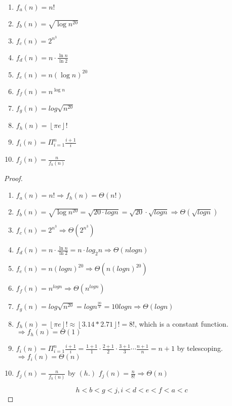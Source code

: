 \documentclass[11pt]{article}
\newcommand{\floor}[1]{\left\lfloor #1 \right\rfloor}
\begin{document}
\begin{enumerate}
\begin{enumerate}
\item \(f_a(n) = n!\)
\item \(f_b(n) = \sqrt{\log{n^{20}}}\)
\item \(f_c(n) = 2^{n^{3}}\)
\item \(f_d(n) = n \cdot \frac{\ln n}{\ln 2}\)
\item \(f_e(n) = n(\log{n})^{20}\)
\item \(f_f(n) = n^{\log{n}}\)
\item \(f_g(n) = log{\sqrt{n^{20}}}\)
\item \(f_h(n) = \floor{\pi e}!\)
\item \(f_i(n) = \Pi^{n}_{i=1} \frac{i+1}{i}\)
\item \(f_j(n) = \frac{n}{f_h(n)}\)
\end{enumerate}

\begin{proof}
\

\begin{enumerate}
    \item \(f_a(n) = n! \Rightarrow f_h(n) = \Theta(n!)\)
    \item \(f_b(n) = \sqrt{\log{n^{20}}} = \sqrt{20 \cdot log{n}} = \sqrt{20} \cdot \sqrt{log{n}} \Rightarrow \Theta(\sqrt{log{n}})\)
    \item \(f_c(n) = 2^{n^{3}} \Rightarrow \Theta(2^{n^{3}})\)
    \item \(f_d(n) = n \cdot \frac{\ln n}{\ln 2} = n \cdot log_{2}{n} \Rightarrow \Theta(n log{n})\)
    \item \(f_e(n) = n(log{n})^{20} \Rightarrow \Theta(n(log{n})^{20})\)
    \item \(f_f(n) = n^{log{n}} \Rightarrow \Theta(n^{log{n}})\)
    \item \(f_g(n) = log{\sqrt{n^{20}}} = log{n^{\frac{20}{2}}} = 10 log n \Rightarrow \Theta(log n)\)
    \item \(f_h(n) = \floor{\pi e}!  \approx \floor{3.14 * 2.71}! = 8!\), which is a constant function. \(\Rightarrow f_h(n) = \Theta(1)\)
    \item \(f_i(n) = \Pi^{n}_{i=1} \frac{i+1}{i} = \frac{1+1}{1} \cdot \frac{2+1}{2} \cdot \frac{3+1}{3} \cdots \frac{n+1}{n} = n + 1\) by telescoping. \(\Rightarrow f_i(n) = \Theta(n)\)
    \item \(f_j(n) = \frac{n}{f_h(n)}\) by \((h.)\) \(f_j(n) = \frac{n}{8!} \Rightarrow \Theta(n)\)
\end{enumerate}

\[
h < b < g < j, i < d < e < f < a < c
\]    
\end{proof}


\end{enumerate}
\end{document}
